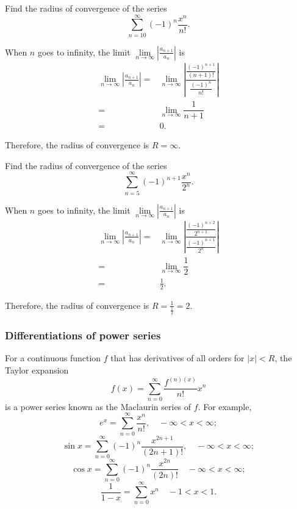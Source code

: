 \begin{example}
  Find the radius of convergence of the series
  \[\sum_{n=10}^\infty (-1)^n \frac{x^n}{n!}.\]
\end{example}
\begin{solution}
  When $n$ goes to infinity, the limit $\lim\limits_{n\to \infty}\left|\frac{a_{n+1}}{a_n}\right|$ is
  \[
  \begin{aligned}
    \lim\limits_{n\to \infty}\left|\frac{a_{n+1}}{a_n}\right|=&\lim\limits_{n\to \infty}\left|\dfrac{\frac{(-1)^{n+1}}{(n+1)!}}{\frac{(-1)^n}{n!}}\right|\\
    =&\lim\limits_{n\to \infty}\dfrac{1}{n+1}\\
    =&0.
  \end{aligned}  
  \]

  Therefore, the radius of convergence is $R=\infty$.
\end{solution}
\begin{exercise}
  Find the radius of convergence of the series
  \[\sum_{n=5}^\infty (-1)^{n+1} \frac{x^n}{2^n}.\]
\end{exercise}
\begin{exersol}
  When $n$ goes to infinity, the limit $\lim\limits_{n\to \infty}\left|\frac{a_{n+1}}{a_n}\right|$ is
  \[
  \begin{aligned}
    \lim\limits_{n\to \infty}\left|\frac{a_{n+1}}{a_n}\right|=&\lim\limits_{n\to \infty}\left|\dfrac{\frac{(-1)^{n+2}}{2^{n+1}}}{\frac{(-1)^{n+1}}{2^n}}\right|\\
    =&\lim\limits_{n\to \infty}\dfrac{1}{2}\\
    =&\frac12.
  \end{aligned}  
  \]

  Therefore, the radius of convergence is $R=\frac{1}{\frac12}=2$.
\end{exersol}

\subsubsection*{Differentiations of power series}

For a continuous function $f$ that has derivatives of all orders for $|x|<R$, the Taylor expansion 
\[f(x)=\sum\limits_{n=0}^\infty\dfrac{f^{(n)(x)}}{n!}x^n\]
is a power series known as the Maclaurin series of $f$. For example,
\[e^{x} = \sum_{n=0}^{\infty} \frac{x^{n}}{n!}, \quad -\infty<x<\infty;\]
\[\sin x = \sum_{n=0}^{\infty} (-1)^{n} \frac{x^{2n+1}}{(2n+1)!}, \quad -\infty<x<\infty;\]
\[\cos x = \sum_{n=0}^{\infty} (-1)^{n} \frac{x^{2n}}{(2n)!} \quad -\infty<x<\infty;\]
\[\frac{1}{1-x} = \sum_{n=0}^{\infty} x^{n} \quad -1<x<1.\]

